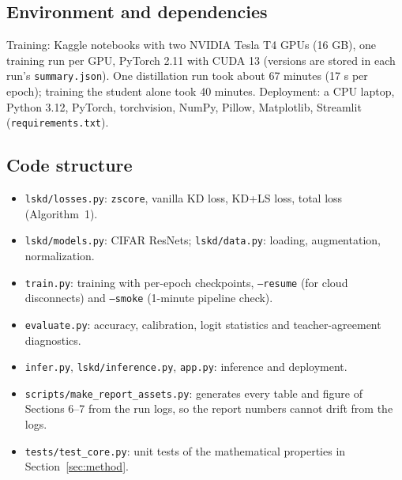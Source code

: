 \documentclass[12pt,a4paper]{article}
\begin{document}
\subsection{Environment and dependencies}
Training: Kaggle notebooks with two NVIDIA Tesla T4 GPUs (16 GB), one training run per GPU, PyTorch 2.11 with CUDA 13 (versions are stored in each run's \texttt{summary.json}). One distillation run took about 67 minutes (17 s per epoch); training the student alone took 40 minutes. Deployment: a CPU laptop, Python 3.12, PyTorch, torchvision, NumPy, Pillow, Matplotlib, Streamlit (\texttt{requirements.txt}).

\subsection{Code structure}
\begin{itemize}[nosep]
\item \texttt{lskd/losses.py}: \texttt{zscore}, vanilla KD loss, KD+LS loss, total loss (Algorithm~1).
\item \texttt{lskd/models.py}: CIFAR ResNets; \texttt{lskd/data.py}: loading, augmentation, normalization.
\item \texttt{train.py}: training with per-epoch checkpoints, \texttt{--resume} (for cloud disconnects) and \texttt{--smoke} (1-minute pipeline check).
\item \texttt{evaluate.py}: accuracy, calibration, logit statistics and teacher-agreement diagnostics.
\item \texttt{infer.py}, \texttt{lskd/inference.py}, \texttt{app.py}: inference and deployment.
\item \texttt{scripts/make\_report\_assets.py}: generates every table and figure of Sections 6--7 from the run logs, so the report numbers cannot drift from the logs.
\item \texttt{tests/test\_core.py}: unit tests of the mathematical properties in Section~\ref{sec:method}.
\end{itemize}
\end{document}
